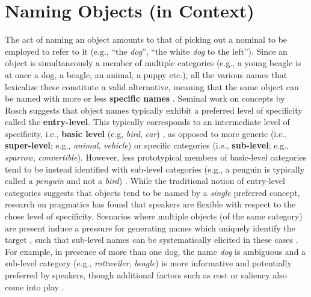\documentclass[runningheads]{llncs}
\begin{document}
\section{Naming Objects (in Context)}
\label{sec:object_naming}

The act of naming an object amounts to that of picking out a nominal to be employed to refer to it (e.g., ``the \textit{dog}'', ``the white \textit{dog} to the left'').
Since an object is simultaneously a member of multiple categories (e.g., a young beagle is at once a dog, a beagle, an animal, a puppy etc.), all the various names that lexicalize these constitute a valid alternative, meaning that the same object can be named with more or less \textbf{specific names} \cite{brown1958shall,murphy2004big}. 
Seminal work on concepts by Rosch suggests that object names typically exhibit a preferred level of specificity called the \textbf{entry-level}. This typically corresponds to an intermediate level of specificity, i.e., \textbf{basic level} (e.g, \textit{bird}, \textit{car}) \cite{rosch1976basic}, as opposed to more generic (i.e., \textbf{super-level}; e.g., \textit{animal}, \textit{vehicle}) or specific categories (i.e., \textbf{sub-level}; e.g., \textit{sparrow}, \textit{convertible}). However, less prototypical members of basic-level categories tend to be instead identified with sub-level categories (e.g., a penguin is typically called a \textit{penguin} and not a \textit{bird}) \cite{jolicoeur1984pictures}. 
While the traditional notion of entry-level categories suggests that objects tend to be named by a \textit{single} preferred concept, research on pragmatics has found that speakers are flexible with respect to the chose level of specificity.
Scenarios where multiple objects (of the same category) are present induce a pressure for generating names which uniquely identify the target \cite{olson1970language}, such that sub-level names can be systematically elicited in these cases \cite{rohde2012communicating} \cite{graf2016animal}. For example, in presence of more than one dog, the name \textit{dog} is ambiguous and a sub-level category (e.g., \textit{rottweiler}, \textit{beagle}) is more informative and potentially preferred by speakers, though additional factors such as cost or saliency also come into play \cite{graf2016animal}  \cite{clark1983common}.
\end{document}
